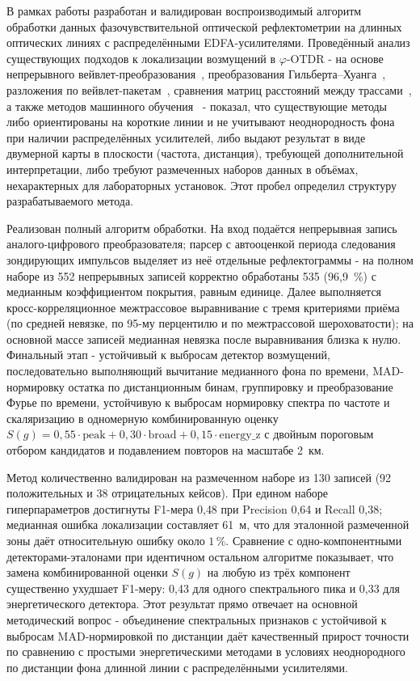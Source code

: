 \documentclass[12pt,a4paper]{extarticle}
\newcommand{\phiOTDR}{$\varphi$-OTDR}
\begin{document}
В рамках работы разработан и валидирован воспроизводимый алгоритм обработки данных фазочувствительной оптической рефлектометрии на длинных оптических линиях с распределёнными EDFA-усилителями. Проведённый анализ существующих подходов к локализации возмущений в \phiOTDR{} - на основе непрерывного вейвлет-преобразования~\cite{Qin2012}, преобразования Гильберта–Хуанга~\cite{Hui2014}, разложения по вейвлет-пакетам~\cite{Li2014}, сравнения матриц расстояний между трассами~\cite{Liu2018}, а также методов машинного обучения~\cite{Wu2019, Shi2020} - показал, что существующие методы либо ориентированы на короткие линии и не учитывают неоднородность фона при наличии распределённых усилителей, либо выдают результат в виде двумерной карты в плоскости (частота, дистанция), требующей дополнительной интерпретации, либо требуют размеченных наборов данных в объёмах, нехарактерных для лабораторных установок. Этот пробел определил структуру разрабатываемого метода.

Реализован полный алгоритм обработки. На вход подаётся непрерывная запись аналого-цифрового преобразователя; парсер с автооценкой периода следования зондирующих импульсов выделяет из неё отдельные рефлектограммы - на полном наборе из 552 непрерывных записей корректно обработаны 535 (96{,}9~\%) с медианным коэффициентом покрытия, равным единице. Далее выполняется кросс-корреляционное межтрассовое выравнивание с тремя критериями приёма (по средней невязке, по 95-му перцентилю и по межтрассовой шероховатости); на основной массе записей медианная невязка после выравнивания близка к нулю. Финальный этап - устойчивый к выбросам детектор возмущений, последовательно выполняющий вычитание медианного фона по времени, MAD-нормировку остатка по дистанционным бинам, группировку и преобразование Фурье по времени, устойчивую к выбросам нормировку спектра по частоте и скаляризацию в одномерную комбинированную оценку $S(g) = 0{,}55\cdot\mathrm{peak} + 0{,}30\cdot\mathrm{broad} + 0{,}15\cdot\mathrm{energy\_z}$ с двойным пороговым отбором кандидатов и подавлением повторов на масштабе 2~км.

Метод количественно валидирован на размеченном наборе из 130 записей (92 положительных и 38 отрицательных кейсов). При едином наборе гиперпараметров достигнуты F1-мера 0{,}48 при Precision 0{,}64 и Recall 0{,}38; медианная ошибка локализации составляет 61~м, что для эталонной размеченной зоны даёт относительную ошибку около $1\,\%$. Сравнение с одно-компонентными детекторами-эталонами при идентичном остальном алгоритме показывает, что замена комбинированной оценки $S(g)$ на любую из трёх компонент существенно ухудшает F1-меру: 0{,}43 для одного спектрального пика и 0{,}33 для энергетического детектора. Этот результат прямо отвечает на основной методический вопрос - объединение спектральных признаков с устойчивой к выбросам MAD-нормировкой по дистанции даёт качественный прирост точности по сравнению с простыми энергетическими методами в условиях неоднородного по дистанции фона длинной линии с распределёнными усилителями.
\end{document}
